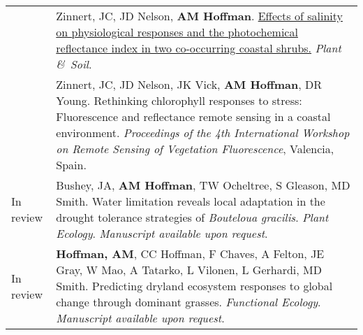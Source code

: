 \documentclass[letterpaper]{deedy-resume} %
\begin{document}
\begin{tabular}{>{\raggedleft\arraybackslash}p{2cm}p{16cm}}
2011 & Zinnert, JC, JD Nelson, \textbf{AM Hoffman}. \href{http://link.springer.com/article/10.1007\%2Fs11104-011-0955-z}{Effects of salinity on physiological responses and the photochemical reflectance index in two co-occurring coastal shrubs.} \textcolor{special}{\textit{Plant \&\ Soil}}. \\

2010 & Zinnert, JC, JD Nelson, JK Vick, \textbf{AM Hoffman}, DR Young. Rethinking chlorophyll responses to stress:  Fluorescence and reflectance remote sensing in a coastal environment.  \textit{Proceedings of the 4th International Workshop on Remote Sensing of Vegetation Fluorescence}, Valencia, Spain.\\






In review & Bushey, JA, \textbf{AM Hoffman}, TW Ocheltree, S Gleason, MD Smith. Water limitation reveals local adaptation in the drought tolerance strategies of \textit{Bouteloua gracilis}. \textcolor{special}{\textit{Plant Ecology}}. \textit{Manuscript available upon request}.\\

In review & \textbf{Hoffman, AM}, CC Hoffman, F Chaves, A Felton, JE Gray, W Mao, A Tatarko, L Vilonen, L Gerhardi, MD Smith. Predicting dryland ecosystem responses to global change through dominant grasses. \textcolor{special}{\textit{Functional Ecology}}. \textit{Manuscript available upon request}.\\


\end{tabular}
\end{document}
